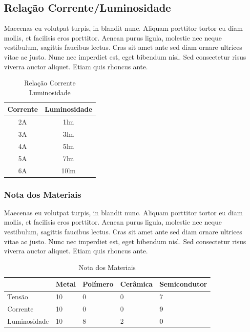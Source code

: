\subsection{Relação Corrente/Luminosidade}
Maecenas eu volutpat turpis, in blandit nunc. Aliquam porttitor tortor eu diam mollis, et facilisis eros porttitor. Aenean purus ligula, molestie nec neque vestibulum, sagittis faucibus lectus. Cras sit amet ante sed diam ornare ultrices vitae ac justo. Nunc nec imperdiet est, eget bibendum nisl. Sed consectetur risus viverra auctor aliquet. Etiam quis rhoncus ante. 
\begin{table}[!htb]
\centering
\begin{tabular}{|c|c|}
\hline
Corrente & Luminosidade \\ \hline
2A       & 1lm          \\ \hline
3A       & 3lm          \\ \hline
4A       & 5lm          \\ \hline
5A       & 7lm          \\ \hline
6A       & 10lm         \\ \hline
\end{tabular}
\caption{Relação Corrente Luminosidade}
\label{tab:Relação corrente lum}
\end{table}

\subsubsection{Nota dos Materiais}
Maecenas eu volutpat turpis, in blandit nunc. Aliquam porttitor tortor eu diam mollis, et facilisis eros porttitor. Aenean purus ligula, molestie nec neque vestibulum, sagittis faucibus lectus. Cras sit amet ante sed diam ornare ultrices vitae ac justo. Nunc nec imperdiet est, eget bibendum nisl. Sed consectetur risus viverra auctor aliquet. Etiam quis rhoncus ante. 

\begin{table}[!htb]
\centering
\caption{Nota dos Materiais}
\begin{tabular}{lllll}
\hline
\multicolumn{1}{|l|}{} & \multicolumn{1}{l|}{Metal} & \multicolumn{1}{l|}{Polímero} & \multicolumn{1}{l|}{Cerâmica} & \multicolumn{1}{l|}{Semicondutor} \\ \hline
Tensão                 & 10                         & 0                             & 0                             & 7                                 \\
Corrente               & 10                         & 0                             & 0                             & 9                                 \\
Luminosidade           & 10                         & 8                             & 2                             & 0                                
\end{tabular}
\label{tab:nota dos materiais}
\end{table}

